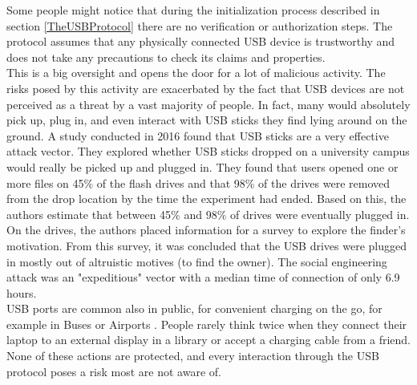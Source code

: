 Some people might notice that during the initialization process described in section \ref{TheUSBProtocol} there are no verification or authorization steps. The protocol assumes that any physically connected USB device is trustworthy and does not take any precautions to check its claims and properties. \\
This is a big oversight and opens the door for a lot of malicious activity. 
The risks posed by this activity are exacerbated by the fact that USB devices are not perceived as a threat by a vast majority of people. In fact, many would absolutely pick up, plug in, and even interact with USB sticks they find lying around on the ground. A study \cite{tischerUsersReallyPlug2016} conducted in 2016 found that USB sticks are a very effective attack vector. They explored whether USB sticks dropped on a university campus would really be picked up and plugged in. They found that users opened one or more files on 45\% of the flash drives and that 98\% of the drives were removed from the drop location by the time the experiment had ended. Based on this, the authors estimate that between 45\% and 98\% of drives were eventually plugged in. On the drives, the authors placed information for a survey to explore the finder's motivation. From this survey, it was concluded that the USB drives were plugged in mostly out of altruistic motives (to find the owner). The social engineering attack was an "expeditious" vector with a median time of connection of only 6.9 hours.  \\
USB ports are common also in public, for convenient charging on the go, for example in Buses or Airports \cite{kumarJuiceJackingUSB2020}. People rarely think twice when they connect their laptop to an external display in a library or accept a charging cable from a friend. None of these actions are protected, and every interaction through the USB protocol poses a risk most are not aware of.

